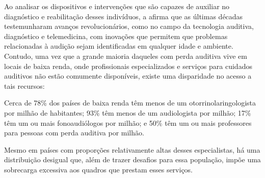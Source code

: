 Ao analisar os dispositivos e intervenções que são capazes de auxiliar no diagnóstico e reabilitação desses indivíduos, a  afirma que as últimas décadas testemunharam avanços revolucionários, como no campo da tecnologia auditiva, diagnóstico e telemedicina, com inovações que permitem que problemas relacionadas à audição sejam identificadas em qualquer idade e ambiente.
Contudo, uma vez que a grande maioria daqueles com perda auditiva vive em locais de baixa renda, onde profissionais especializados e serviços para cuidados auditivos não estão comumente disponíveis, existe uma disparidade no acesso a tais recursos:




\begin{citacao}
    Cerca de 78\% dos países de baixa renda têm menos de um otorrinolaringologista por milhão de habitantes; 93\% têm menos de um audiologista por milhão; 17\% têm um ou mais fonoaudiólogos por milhão; e 50\% têm um ou mais professores para pessoas com perda auditiva por milhão.

    Mesmo em países com proporções relativamente altas desses especialistas, há uma distribuição desigual que, além de trazer desafios para essa população, impõe uma sobrecarga excessiva aos quadros que prestam esses serviços.~\cite{opas-2021-oms-estima}
\end{citacao}

